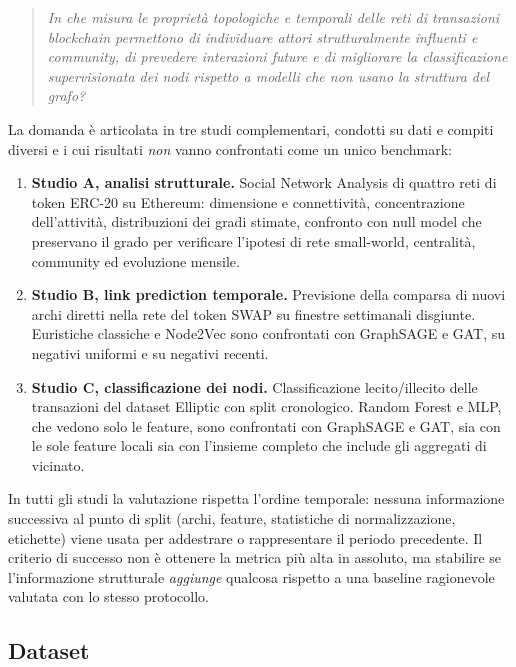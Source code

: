 \documentclass[11pt]{article}
\begin{document}
\begin{quote}
    \emph{In che misura le proprietà topologiche e temporali delle reti di
    transazioni blockchain permettono di individuare attori strutturalmente
    influenti e community, di prevedere interazioni future e di migliorare la
    classificazione supervisionata dei nodi rispetto a modelli che non usano la
    struttura del grafo?}
\end{quote}

La domanda è articolata in tre studi complementari, condotti su dati e
compiti diversi e i cui risultati \emph{non} vanno confrontati come un unico
benchmark:

\begin{enumerate}
    \item \textbf{Studio A, analisi strutturale.} Social Network Analysis di
    quattro reti di token ERC-20 su Ethereum: dimensione e connettività,
    concentrazione dell'attività, distribuzioni dei gradi stimate, confronto con null model che preservano il
    grado per verificare l'ipotesi di rete small-world,
    centralità, community ed evoluzione mensile.
    \item \textbf{Studio B, link prediction temporale.} Previsione della
    comparsa di nuovi archi diretti nella rete del token SWAP su finestre
    settimanali disgiunte. Euristiche classiche e Node2Vec sono confrontati con GraphSAGE e GAT, su negativi
    uniformi e su negativi recenti.
    \item \textbf{Studio C, classificazione dei nodi.} Classificazione
    lecito/illecito delle transazioni del dataset Elliptic
    \cite{weber2019elliptic} con split cronologico. Random Forest e MLP, che
    vedono solo le feature, sono confrontati con GraphSAGE e GAT, sia con le
    sole feature locali sia con l'insieme completo che include gli aggregati
    di vicinato.
\end{enumerate}

In tutti gli studi la valutazione rispetta l'ordine temporale: nessuna
informazione successiva al punto di split (archi, feature, statistiche di
normalizzazione, etichette) viene usata per addestrare o rappresentare il
periodo precedente. Il criterio di successo non è ottenere la metrica più
alta in assoluto, ma stabilire se l'informazione strutturale \emph{aggiunge}
qualcosa rispetto a una baseline ragionevole valutata con lo stesso
protocollo.

\subsection{Dataset}
\end{document}
